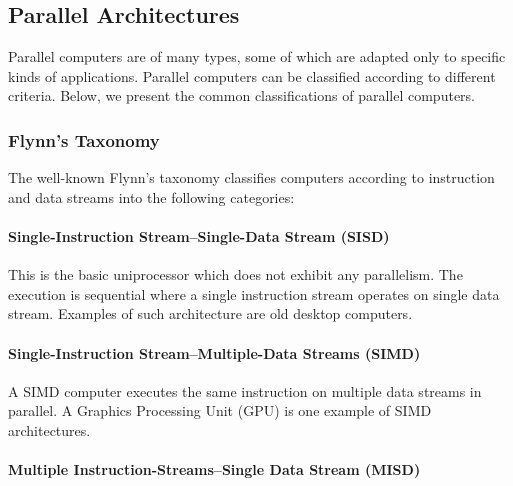 
\subsection{Parallel Architectures}

Parallel computers are of many types, some of which are adapted only to specific kinds of applications. Parallel computers can be classified according to different criteria. Below, we present the common classifications of parallel computers. 

\subsubsection{Flynn's Taxonomy}

The well-known Flynn's taxonomy \cite{flynn:1972} classifies computers according to instruction and data streams into the following categories:

\paragraph{Single-Instruction Stream--Single-Data Stream (SISD)}

This is the basic uniprocessor which does not exhibit any parallelism. The execution is sequential where a single instruction stream operates on single data stream. Examples of such architecture are old desktop computers.

\paragraph{Single-Instruction Stream--Multiple-Data Streams (SIMD)}

A SIMD computer executes the same instruction on multiple data streams in parallel. A Graphics Processing Unit (GPU) is one example of SIMD architectures.

\paragraph{Multiple Instruction-Streams--Single Data Stream (MISD)}

